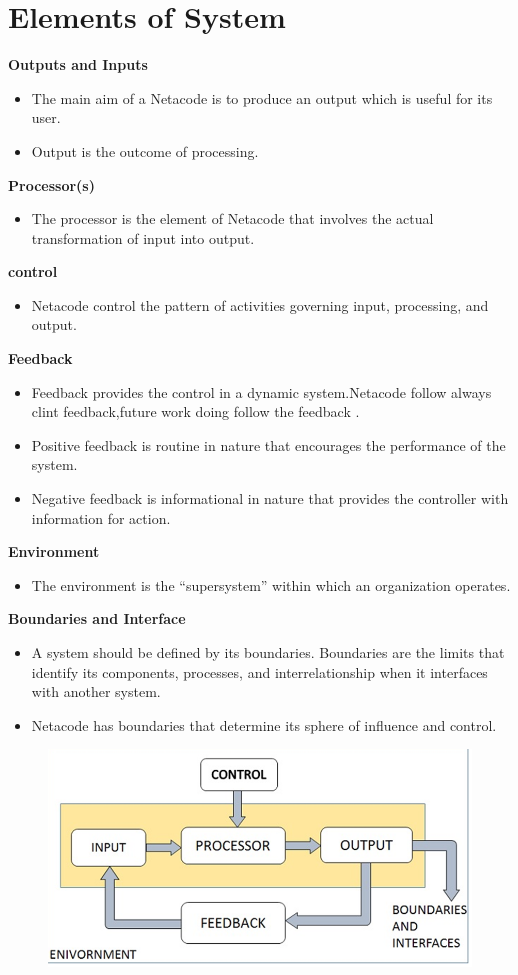 \documentclass[a4paper,12pt]{report}
\begin{document}
\section{Elements of System}
\textbf{Outputs and Inputs}
\begin{itemize}
	\item 	The main aim of a Netacode is to produce an output which is useful for its user.
	\item 	Output is the outcome of processing.
\end{itemize}
\textbf{Processor(s)}
\begin{itemize}
	\item 	The processor is the element of Netacode that involves the actual transformation of input into output.
\end{itemize}
\textbf{control}
\begin{itemize}
	\item Netacode control the pattern of activities governing input, processing, and output.
\end{itemize}
\textbf{Feedback}
\begin{itemize}
	\item Feedback provides the control in a dynamic system.Netacode follow always clint feedback,future work doing follow the feedback .
	\item	Positive feedback is routine in nature that encourages the performance of the system.
	\item	Negative feedback is informational in nature that provides the controller with information for action.
\end{itemize}
\textbf{Environment}
\begin{itemize}
	\item	The environment is the “supersystem” within which an organization operates.
\end{itemize}
\textbf{Boundaries and Interface}
\begin{itemize}
	\item	A system should be defined by its boundaries. Boundaries are the limits that identify its components, processes, and interrelationship when it interfaces with another system.
	\item	Netacode  has boundaries that determine its sphere of influence and control.
\end{itemize}
\begin{figure}[h]
	\centering
	\includegraphics[width=0.7\linewidth]{2}
	\label{fig:2}
\end{figure}
\end{document}
